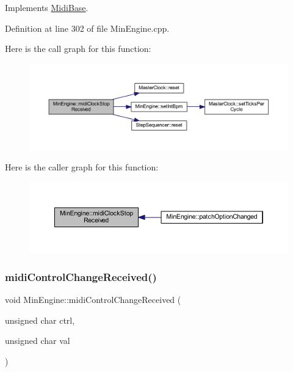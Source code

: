 Implements \hyperlink{class_midi_base_ab9a5c65ebffdfc31e118fef9e4dd04bb}{Midi\+Base}.



Definition at line 302 of file Min\+Engine.\+cpp.

Here is the call graph for this function\+:
\nopagebreak
\begin{figure}[H]
\begin{center}
\leavevmode
\includegraphics[width=350pt]{d4/d0f/class_min_engine_a08ac0328006e01f44ffbb3c78f4f504a_cgraph}
\end{center}
\end{figure}
Here is the caller graph for this function\+:
\nopagebreak
\begin{figure}[H]
\begin{center}
\leavevmode
\includegraphics[width=350pt]{d4/d0f/class_min_engine_a08ac0328006e01f44ffbb3c78f4f504a_icgraph}
\end{center}
\end{figure}
\mbox{\label{class_min_engine_ad7404def0db3926e77c8828cab13cca9}} 
\subsubsection{\texorpdfstring{midi\+Control\+Change\+Received()}{midiControlChangeReceived()}}
{\footnotesize\ttfamily void Min\+Engine\+::midi\+Control\+Change\+Received (\begin{DoxyParamCaption}\item[{unsigned char}]{ctrl,  }\item[{unsigned char}]{val }\end{DoxyParamCaption})\hspace{0.3cm}{\ttfamily [virtual]}}




